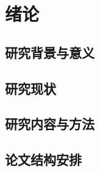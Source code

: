 
\chapter{绪论}\label{chap:introduction}

\section{研究背景与意义}\label{sec:background}

\section{研究现状}\label{sec:stateoftheart}

\section{研究内容与方法}\label{sec:methods}

\section{论文结构安排}\label{sec:structure}
